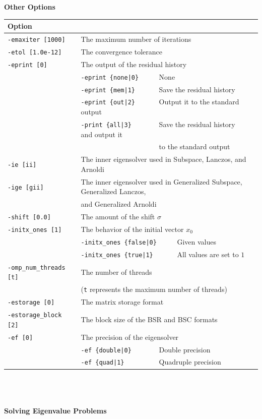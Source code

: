 \documentclass[a4paper]{article}
\begin{document}
\begin{minipage}[t]{\textwidth}
\begin{center}
{\bf Other Options}\\
\begin{tabular}{l|ll}\hline\hline
Option &                          \\ \hline
\verb=-emaxiter [1000]= & The maximum number of iterations         \\ 
\verb=-etol [1.0e-12]=  & The convergence tolerance                \\
\verb=-eprint [0]=      & The output of the residual history                \\
                       & \verb=-eprint {none|0}     =  None \\
                       & \verb=-eprint {mem|1}      =  Save the residual history\\
                       & \verb=-eprint {out|2}      =  Output it to the standard output\\
                       & \verb=-print {all|3}       =  Save the residual history and output it \\
                       & \verb=                     =  to the standard output \\
\verb=-ie [ii]= & The inner eigensolver used in Subspace, Lanczos, and Arnoldi\\
\verb=-ige [gii]= & The inner eigensolver used in Generalized Subspace, Generalized Lanczos, \\
                       & and Generalized Arnoldi\\
\verb=-shift [0.0]= & The amount of the shift $\sigma$ \\
\verb=-initx_ones [1]= & The behavior of the initial vector $x_{0}$  \\
                       & \verb=-initx_ones {false|0}     =  Given values \\
                       & \verb=-initx_ones {true|1}      =  All values are set to $1$ \\
\verb=-omp_num_threads [t]= & The number of threads        \\ 
                            & (\verb=t= represents the maximum number of
 threads) \\
\verb=-estorage [0]=   & The matrix storage format \\
\verb=-estorage_block [2]=& The block size of the BSR and BSC formats\\ 
\verb=-ef [0]=         & The precision of the eigensolver\\
                       & \verb=-ef {double|0}       =  Double precision \\ 
                       & \verb=-ef {quad|1}         =  Quadruple precision \\
\hline         
\end{tabular}
\end{center}
\end{minipage}
\\ \\ \\
\noindent
{\bf Solving Eigenvalue Problems}
\end{document}
